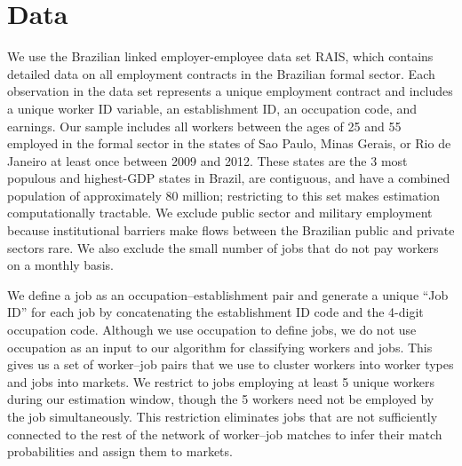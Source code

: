 \documentclass[12pt]{article}
\theoremstyle{definition}
\theoremstyle{plain}
\begin{document}

\section{Data} 
\label{sec:data}

We use the Brazilian linked employer-employee data set RAIS, which contains detailed data on all employment contracts in the Brazilian formal sector. Each observation in the data set represents a unique employment contract and includes a unique worker ID variable, an establishment ID, an occupation code, and earnings. Our sample includes all workers between the ages of 25 and 55 employed in the formal sector in the states of Sao Paulo, Minas Gerais, or Rio de Janeiro at least once between 2009 and 2012. These states are the 3 most populous and highest-GDP states in Brazil, are contiguous, and have a combined population of approximately 80 million; restricting to this set makes estimation computationally tractable.  We exclude public sector and military employment because institutional barriers make flows between the Brazilian public and private sectors rare. We also exclude the small number of jobs that do not pay workers on a monthly basis.

We define a job as an occupation--establishment pair and generate a unique ``Job ID'' for each job by concatenating the establishment ID code and the 4-digit occupation code.  Although we use occupation to define jobs, we do not use occupation as an input to our algorithm for classifying workers and jobs. This gives us a set of worker--job pairs that we use to cluster workers into worker types and jobs into markets. We restrict to jobs employing at least 5 unique workers during our estimation window, though the 5 workers need not be employed by the job simultaneously. This restriction eliminates jobs that are not sufficiently connected to the rest of the network of worker--job matches to infer their match probabilities and assign them to markets. 
\end{document}
